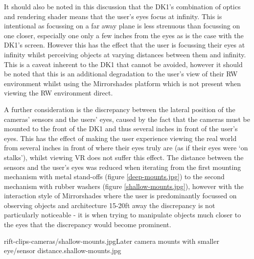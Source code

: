It should also be noted in this discussion that the DK1's combination of optics and rendering shader means that the user's eyes focus at infinity. This is intentional as focussing on a far away plane is less strenuous than focussing on one closer, especially one only a few inches from the eyes as is the case with the DK1's screen. However this has the effect that the user is focussing their eyes at infinity whilst perceiving objects at varying distances between them and infinity. This is a caveat inherent to the DK1 that cannot be avoided, however it should be noted that this is an additional degradation to the user's view of their RW environment whilst using the Mirrorshades platform which is not present when viewing the RW environment direct.

A further consideration is the discrepancy between the lateral position of the cameras' sensors and the users' eyes, caused by the fact that the cameras must be mounted to the front of the DK1 and thus several inches in front of the user's eyes. This has the effect of making the user experience viewing the real world from several inches in front of where their eyes truly are (as if their eyes were `on stalks'), whilst viewing VR does not suffer this effect. The distance between the sensors and the user's eyes was reduced when iterating from the first mounting mechanism with metal stand-offs (figure \ref{deep-mounts.jpg}) to the second mechanism with rubber washers (figure \ref{shallow-mounts.jpg}), however with the interaction style of Mirrorshades where the user is predominantly focussed on observing objects and architecture 15-20ft away the discrepancy is not particularly noticeable - it is when trying to manipulate objects much closer to the eyes that the discrepancy would become prominent.

       {rift-clips-cameras/shallow-mounts.jpg}{Later camera mounts with smaller eye/sensor distance.}{shallow-mounts.jpg}




